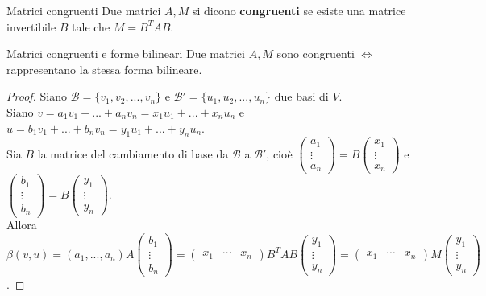 \documentclass[a4paper]{article}
\theoremstyle{definition}
\begin{document}
	\begin{deff}{Matrici congruenti}{}
		Due matrici $A, M$ si dicono \textbf{congruenti} se esiste una matrice invertibile $B$ tale che $M = B^TAB$.
	\end{deff}

	\begin{teo}{Matrici congruenti e forme bilineari}{}
		Due matrici $A, M$ sono congruenti $\Leftrightarrow$ rappresentano la stessa forma bilineare.
	\end{teo}
	\begin{proof}
		Siano $\mathcal{B} = \{v_1, v_2, ..., v_n\}$ e $\mathcal{B}' = \{u_1, u_2, ..., u_n\}$ due basi di $V$. \\
		Siano $v = a_1v_1 + ... + a_nv_n = x_1u_1 + ... + x_nu_n$ e $u = b_1v_1 + ... + b_nv_n = y_1u_1 + ... + y_nu_n$. \\
		Sia $B$ la matrice del cambiamento di base da $\mathcal{B}$ a $\mathcal{B}'$, cioè $\begin{pmatrix}
			a_1 \\
			\vdots \\
			a_n
		\end{pmatrix} = B \begin{pmatrix}
			x_1 \\
			\vdots \\
			x_n
		\end{pmatrix}$ e $\begin{pmatrix}
			b_1 \\
			\vdots \\
			b_n
		\end{pmatrix} = B \begin{pmatrix}
			y_1 \\
			\vdots \\
			y_n
		\end{pmatrix}$. \\
		Allora $\beta(v, u) = (a_1, ..., a_n)A \begin{pmatrix}
			b_1 \\
			\vdots \\
			b_n
		\end{pmatrix} = \begin{pmatrix}
			x_1 & \cdots & x_n
		\end{pmatrix}B^T A B \begin{pmatrix}
			y_1 \\
			\vdots \\
			y_n
		\end{pmatrix} = \begin{pmatrix}
			x_1 & \cdots & x_n
		\end{pmatrix} M \begin{pmatrix}
			y_1 \\
			\vdots \\
			y_n
		\end{pmatrix}$.
	\end{proof}
\end{document}
